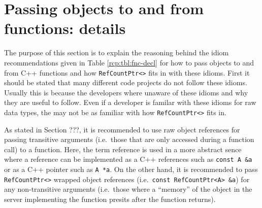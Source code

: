 %
\section{Passing objects to and from functions: details}
\label{rcp:apdx:passing_args}
%

The purpose of this section is to explain the reasoning behind the
idiom recommendations given in Table {}\ref{rcp:tbl:fnc-decl} for how
to pass objects to and from C++ functions and how
{}\texttt{Ref\-Count\-Ptr<>} fits in with these idioms.  First it
should be stated that many different code projects do not follow these
idioms.  Usually this is because the developers where unaware of these
idioms and why they are useful to follow.  Even if a developer is
familar with these idioms for raw data types, the may not be as
familiar with how {}\texttt{Ref\-Count\-Ptr<>} fits in.

As stated in Section ???, it is recommended to use raw object
references for passing transitive arguments (i.e.~those that are only
accessed during a function call) to a function.  Here, the term
reference is used in a more abstract sence where a reference can be
implemented as a C++ references such as {}\texttt{const A \&a} or as a
C++ pointer such as {}\texttt{A *a}.  On the other hand, it is
recommended to pass {}\texttt{Ref\-Count\-Ptr<>} wrapped object
references (i.e.~{}\texttt{const Ref\-Count\-Ptr<A> \&a}) for any
non-transitive arguments (i.e.~those where a ``memory'' of the object
in the server implementing the function presits after the function
returns).

